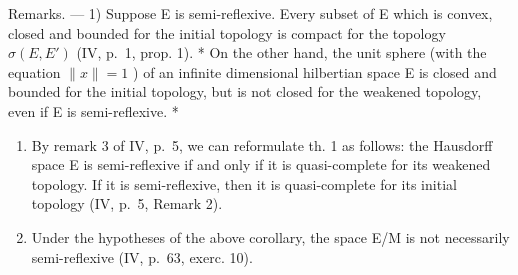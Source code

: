 Remarks. --- 1) Suppose E is semi-reflexive. Every subset of E which is convex, closed and bounded for the initial topology is compact for the topology \(\sigma(E, E')\) (IV, p.~1, prop. 1). * On the other hand, the unit sphere (with the equation \(\|x\|=1\) ) of an infinite dimensional hilbertian space E is closed and bounded for the initial topology, but is not closed for the weakened topology, even if E is semi-reflexive. *

\begin{enumerate}
\def\labelenumi{\arabic{enumi})}
\setcounter{enumi}{1}
\item
  By remark 3 of IV, p.~5, we can reformulate th. 1 as follows: the Hausdorff space E is semi-reflexive if and only if it is quasi-complete for its weakened topology. If it is semi-reflexive, then it is quasi-complete for its initial topology (IV, p.~5, Remark 2).
\item
  Under the hypotheses of the above corollary, the space E/M is not necessarily semi-reflexive (IV, p.~63, exerc. 10).
\end{enumerate}

